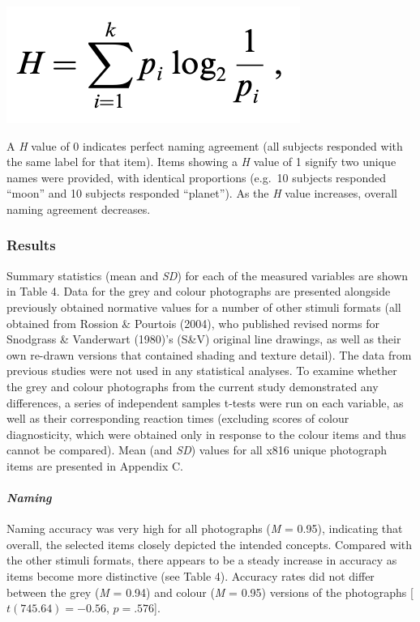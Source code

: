 \documentclass[
  11pt,
]{article}
\begin{document}
\includegraphics[width=0.5\linewidth]{./resources/images/h_calculation}

A \emph{H} value of 0 indicates perfect naming agreement (all subjects
responded with the same label for that item). Items showing a \emph{H}
value of 1 signify two unique names were provided, with identical
proportions (e.g.~10 subjects responded ``moon'' and 10 subjects
responded ``planet''). As the \emph{H} value increases, overall naming
agreement decreases.

\hypertarget{results-1}{%
\subsubsection{Results}\label{results-1}}

Summary statistics (mean and \emph{SD}) for each of the measured
variables are shown in Table 4. Data for the grey and colour photographs
are presented alongside previously obtained normative values for a
number of other stimuli formats (all obtained from Rossion \& Pourtois
(2004), who published revised norms for Snodgrass \& Vanderwart (1980)'s
(S\&V) original line drawings, as well as their own re-drawn versions
that contained shading and texture detail). The data from previous
studies were not used in any statistical analyses. To examine whether
the grey and colour photographs from the current study demonstrated any
differences, a series of independent samples t-tests were run on each
variable, as well as their corresponding reaction times (excluding
scores of colour diagnosticity, which were obtained only in response to
the colour items and thus cannot be compared). Mean (and \emph{SD})
values for all x816 unique photograph items are presented in Appendix C.

\hypertarget{naming}{%
\paragraph{\texorpdfstring{\emph{Naming}}{Naming}}\label{naming}}

Naming accuracy was very high for all photographs (\emph{M} = 0.95),
indicating that overall, the selected items closely depicted the
intended concepts. Compared with the other stimuli formats, there
appears to be a steady increase in accuracy as items become more
distinctive (see Table 4). Accuracy rates did not differ between the
grey (\emph{M} = 0.94) and colour (\emph{M} = 0.95) versions of the
photographs {[}\(t(745.64) = -0.56\), \(p = .576\){]}.
\end{document}
